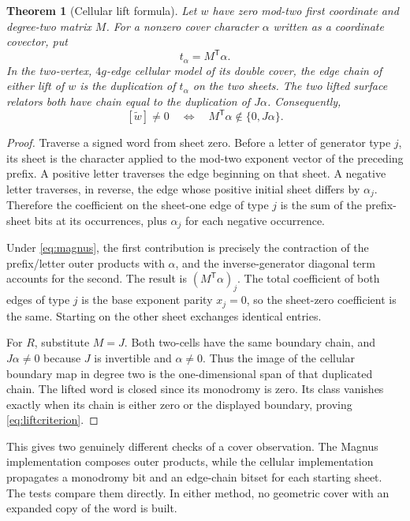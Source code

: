 \documentclass[11pt,letterpaper]{article}
\newtheorem{theorem}{Theorem}[section]
\theoremstyle{definition}
\theoremstyle{remark}
\begin{document}
\begin{theorem}[Cellular lift formula]\label{thm:bridge}
Let $w$ have zero mod-two first coordinate and degree-two matrix $M$. For a nonzero cover character $\alpha$ written as a coordinate covector, put
\[
 t_\alpha=M^{\mathsf T}\alpha.
\]
In the two-vertex, $4g$-edge cellular model of its double cover, the edge chain of either lift of $w$ is the duplication of $t_\alpha$ on the two sheets. The two lifted surface relators both have chain equal to the duplication of $J\alpha$. Consequently,
\begin{equation}\label{eq:liftcriterion}
 [\widetilde w]\ne0\quad\Longleftrightarrow\quad
 M^{\mathsf T}\alpha\notin\{0,J\alpha\}.
\end{equation}
\end{theorem}
\begin{proof}
Traverse a signed word from sheet zero. Before a letter of generator type $j$, its sheet is the character applied to the mod-two exponent vector of the preceding prefix. A positive letter traverses the edge beginning on that sheet. A negative letter traverses, in reverse, the edge whose positive initial sheet differs by $\alpha_j$. Therefore the coefficient on the sheet-one edge of type $j$ is the sum of the prefix-sheet bits at its occurrences, plus $\alpha_j$ for each negative occurrence.

Under \eqref{eq:magnus}, the first contribution is precisely the contraction of the prefix/letter outer products with $\alpha$, and the inverse-generator diagonal term accounts for the second. The result is $(M^{\mathsf T}\alpha)_j$. The total coefficient of both edges of type $j$ is the base exponent parity $x_j=0$, so the sheet-zero coefficient is the same. Starting on the other sheet exchanges identical entries.

For $R$, substitute $M=J$. Both two-cells have the same boundary chain, and $J\alpha\ne0$ because $J$ is invertible and $\alpha\ne0$. Thus the image of the cellular boundary map in degree two is the one-dimensional span of that duplicated chain. The lifted word is closed since its monodromy is zero. Its class vanishes exactly when its chain is either zero or the displayed boundary, proving \eqref{eq:liftcriterion}.
\end{proof}

This gives two genuinely different checks of a cover observation. The Magnus implementation composes outer products, while the cellular implementation propagates a monodromy bit and an edge-chain bitset for each starting sheet. The tests compare them directly. In either method, no geometric cover with an expanded copy of the word is built.
\end{document}
